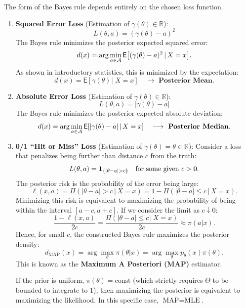 \begin{ex}
    The form of the Bayes rule depends entirely on the chosen loss function.
    
    \begin{enumerate}[label=\roman*.]
        \item \textbf{Squared Error Loss} (Estimation of \(\gamma(\theta) \in \mathbb{R}\)):
        \[ L(\theta, a) = (\gamma(\theta) - a)^2 \]
        The Bayes rule minimizes the posterior expected squared error:
        \[
        d(x) = \arg\min_{a \in \mathcal{A}} \mathsf{E} \big[ (\gamma(\theta) - a)^2 \,|\, X = x \big].
        \]
        As shown in introductory statistics, this is minimized by the expectation:
        \[ d(x) = \mathsf{E} [\gamma(\theta) \,|\, X = x] \quad \longrightarrow \textbf{ Posterior Mean}. \]

        \item \textbf{Absolute Error Loss} (Estimation of \(\gamma(\theta) \in \mathbb{R}\)):
        \[ L(\theta, a) = |\gamma(\theta) - a| \]
        The Bayes rule minimizes the posterior expected absolute deviation:
        \[
        d(x) = \arg\min_{a \in \mathcal{A}} \mathsf{E}[|\gamma(\theta) - a| \,|\, X = x] \quad \longrightarrow \textbf{ Posterior Median}.
        \]

        \item \textbf{0/1 ``Hit or Miss'' Loss} (Estimation of \(\gamma(\theta) = \theta \in \mathbb{R}\)):
        Consider a loss that penalizes being further than distance \(c\) from the truth:
        \[ L(\theta, a) = \boldsymbol{1}_{\{|\theta - a| > c\}} \quad \text{for some given } c > 0. \]
        The posterior risk is the probability of the error being large:
        \[ \ell(x,a) = \Pi(|\theta - a| > c \,|\, X = x) = 1 - \Pi(|\theta - a| \le c \,|\, X = x). \]
        Minimizing this risk is equivalent to maximizing the probability of being within the interval \([a-c, a+c]\). If we consider the limit as \(c \downarrow 0\):
        \[ \frac{1-\ell(x,a)}{2c} = \frac{\Pi(|\theta-a| \le c \,|\, X=x)}{2c} \approx \pi(a|x). \]
        Hence, for small \(c\), the constructed Bayes rule maximizes the posterior density:
        \[
        d_{\text{MAP}}(x) = \arg \max_{\theta} \pi(\theta|x) = \arg \max_{\theta} p_{\theta}(x)\pi(\theta).
        \]
        This is known as the \textbf{Maximum A Posteriori (MAP)} estimator.

\begin{remark}
    If the prior is uniform, \(\pi(\theta) = \text{const}\) (which strictly requires \(\Theta\) to be bounded to integrate to 1), then maximizing the posterior is equivalent to maximizing the likelihood. In this specific case, \(\text{MAP} = \text{MLE}\).
\end{remark}
    \end{enumerate}
\end{ex}

